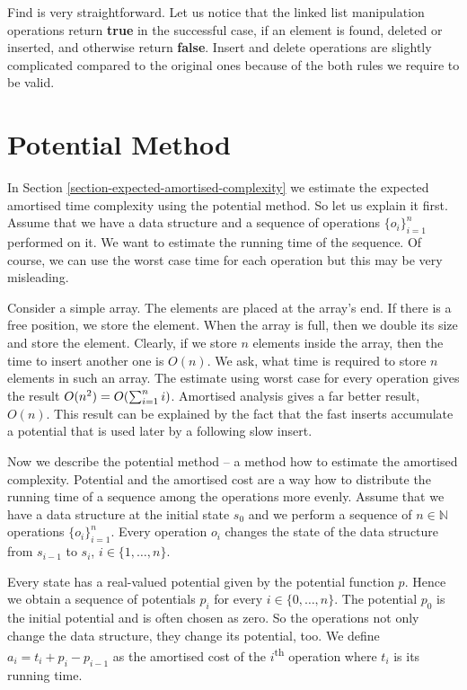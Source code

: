 Find is very straightforward. Let us notice that the linked list manipulation operations return \textbf{true} in the successful case, if an element is found, deleted or inserted, and otherwise return \textbf{false}. Insert and delete  operations are slightly complicated compared to the original ones because of the both rules we require to be valid.

\section{Potential Method} 
In Section \ref{section-expected-amortised-complexity} we estimate the expected amortised time complexity using the potential method. So let us explain it first. Assume that we have a data structure and a sequence of operations $\{o_i\}_{i = 1}^{n}$ performed on it. We want to estimate the running time of the sequence. Of course, we can use the worst case time for each operation but this may be very misleading. 

Consider a simple array. The elements are placed at the array's end. If there is a free position, we store the element. When the array is full, then we double its size and store the element. Clearly, if we store $n$ elements inside the array, then the time to insert another one is $O(n)$. We ask, what time is required to store $n$ elements in such an array. The estimate using worst case for every operation gives the result $O(n ^ 2) =O(\sum\displaylimits_{i = 1}^{n} i)$. Amortised analysis gives a far better result, $O(n)$. This result can be explained by the fact that the fast inserts accumulate a potential that is used later by a following slow insert.

Now we describe the potential method -- a method how to estimate the amortised complexity. Potential and the amortised cost are a way how to distribute the running time of a sequence among the operations more evenly. Assume that we have a data structure at the initial state $s_0$ and we perform a sequence of $n \in \mathbb{N}$ operations $\{o_i\}_{i = 1}^{n}$. Every operation $o_i$ changes the state of the data structure from $s_{i - 1}$ to $s_i$, $i \in \{1, \dots, n\}$. 

Every state has a real-valued potential given by the potential function $p$. Hence we obtain a sequence of potentials $p_i$ for every $i \in \{0, \dots, n\}$. The potential $p_0$ is the initial potential and is often chosen as zero. So the operations not only change the data structure, they change its potential, too. We define $a_i = t_i + p_{i} - p_{i - 1}$ as the amortised cost of the $i$\textsuperscript{th} operation where $t_i$ is its running time. 

